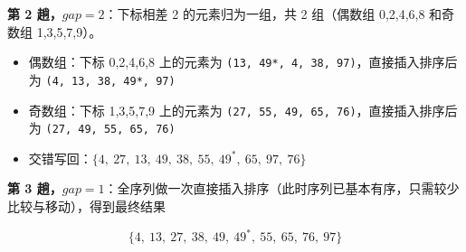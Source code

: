 \documentclass[11pt,openany,UTF8]{ctexbook}
\begin{document}
\textbf{第 2 趟，$gap=2$}：下标相差 2 的元素归为一组，共 2 组（偶数组 0,2,4,6,8 和奇数组 1,3,5,7,9）。

\begin{itemize}
\item 偶数组：下标 0,2,4,6,8 上的元素为 \texttt{(13,\allowbreak{} 49*,\allowbreak{} 4,\allowbreak{} 38,\allowbreak{} 97)\allowbreak{}}，直接插入排序后为 \texttt{(4,\allowbreak{} 13,\allowbreak{} 38,\allowbreak{} 49*,\allowbreak{} 97)\allowbreak{}}
\item 奇数组：下标 1,3,5,7,9 上的元素为 \texttt{(27,\allowbreak{} 55,\allowbreak{} 49,\allowbreak{} 65,\allowbreak{} 76)\allowbreak{}}，直接插入排序后为 \texttt{(27,\allowbreak{} 49,\allowbreak{} 55,\allowbreak{} 65,\allowbreak{} 76)\allowbreak{}}
\item 交错写回：$\{4,\ 27,\ 13,\ 49,\ 38,\ 55,\ 49^*,\ 65,\ 97,\ 76\}$
\end{itemize}
\textbf{第 3 趟，$gap=1$}：全序列做一次直接插入排序（此时序列已基本有序，只需较少比较与移动），得到最终结果

\[\{4,\ 13,\ 27,\ 38,\ 49,\ 49^*,\ 55,\ 65,\ 76,\ 97\}\]
\end{document}
